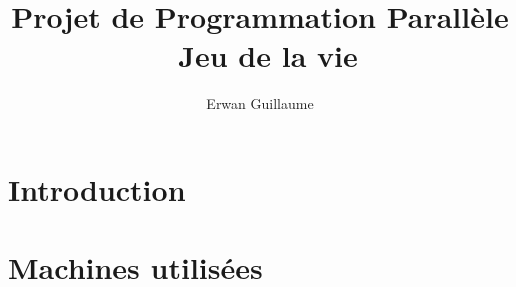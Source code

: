 \documentclass[12pt]{report}
\title{Projet de Programmation Parallèle \\ 
		\hfill \break Jeu de la vie}
\author{Erwan \bsc{Dupland} \hspace*{1cm}
	      Guillaume \bsc{Floret}}
\date{}
\begin{document}
\begin{sffamily}

\maketitle

\renewcommand{\chaptername}{Partie}
\renewcommand{\contentsname}{Sommaire}

\tableofcontents


\chapter{Introduction}


\chapter{Machines utilisées}


\end{sffamily}
\end{document}
